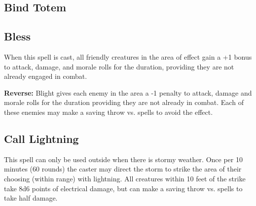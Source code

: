 \begin{multicols*}{2}
\subsection{Bind Totem}\label{spell:Bind Totem}



\subsection{Bless}\label{spell:Bless}

When this spell is cast, all friendly creatures in the area of effect gain a +1 bonus to attack, damage, and morale rolls for the duration, providing they are not already engaged in combat.

\textbf{Reverse:} \hypertarget{spell:Blight}{Blight} gives each enemy in the area a -1 penalty to attack, damage and morale rolls for the duration providing they are not already in combat. Each of these enemies may make a saving throw vs. spells to avoid the effect.

\subsection{Call Lightning}\label{spell:Call Lightning}

This spell can only be used outside when there is stormy weather. Once per 10 minutes (60 rounds) the caster may direct the storm to strike the area of their choosing (within range) with lightning. All creatures within 10 feet of the strike take 8d6 points of electrical damage, but can make a saving throw vs. spells to take half damage.


\end{multicols*}
